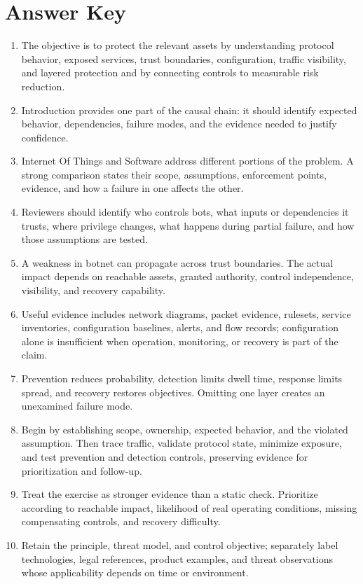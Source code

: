 \documentclass[11pt,letterpaper]{article}
\begin{document}
\section*{Answer Key}
\begin{enumerate}
\item The objective is to protect the relevant assets by understanding protocol behavior, exposed services, trust boundaries, configuration, traffic visibility, and layered protection and by connecting controls to measurable risk reduction.
\item Introduction provides one part of the causal chain: it should identify expected behavior, dependencies, failure modes, and the evidence needed to justify confidence.
\item Internet Of Things and Software address different portions of the problem. A strong comparison states their scope, assumptions, enforcement points, evidence, and how a failure in one affects the other.
\item Reviewers should identify who controls bots, what inputs or dependencies it trusts, where privilege changes, what happens during partial failure, and how those assumptions are tested.
\item A weakness in botnet can propagate across trust boundaries. The actual impact depends on reachable assets, granted authority, control independence, visibility, and recovery capability.
\item Useful evidence includes network diagrams, packet evidence, rulesets, service inventories, configuration baselines, alerts, and flow records; configuration alone is insufficient when operation, monitoring, or recovery is part of the claim.
\item Prevention reduces probability, detection limits dwell time, response limits spread, and recovery restores objectives. Omitting one layer creates an unexamined failure mode.
\item Begin by establishing scope, ownership, expected behavior, and the violated assumption. Then trace traffic, validate protocol state, minimize exposure, and test prevention and detection controls, preserving evidence for prioritization and follow-up.
\item Treat the exercise as stronger evidence than a static check. Prioritize according to reachable impact, likelihood of real operating conditions, missing compensating controls, and recovery difficulty.
\item Retain the principle, threat model, and control objective; separately label technologies, legal references, product examples, and threat observations whose applicability depends on time or environment.
\end{enumerate}
\end{document}

